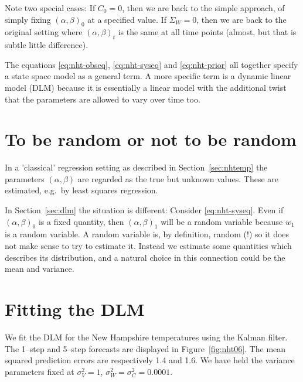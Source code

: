 Note two special cases: If $C_0=0$, then we are back to the simple
approach, of simply fixing $(\alpha,\beta)_{0}$ at a specified value. 
If $\Sigma_W=0$, then we are back to the original setting
where $(\alpha,\beta)_t$ is the same at all time points (almost, but
that is subtle little difference). 

The equations \eqref{eq:nht-obseq}, \eqref{eq:nht-syseq} and
\eqref{eq:nht-prior} all together specify a state space model as a
general term. A more specific term is a dynamic linear model (DLM)
because it is essentially a linear model with the additional twist
that the parameters are allowed to vary over time too.


\section{To be random or not to be random}

In a 'classical' regression setting as described in
Section~\ref{sec:nhtemp} the parameters $(\alpha,\beta)$ are regarded
as the true but unknown values. These are estimated, e.g.\ by least
squares regression. 

In Section~\ref{sec:dlm} the situation is different: Consider
\eqref{eq:nht-syseq}. Even if $(\alpha,\beta)_0$ is a fixed quantity,
then $(\alpha,\beta)_1$ will be a random variable because $w_1$ is a
random variable. A random variable is, by definition, random (!) so it
does not make sense to try to estimate it. Instead we estimate some
quantities which describes its distribution, and  a natural choice in
this connection could be the mean and variance. 










\section{Fitting the DLM}

We fit the DLM for the New Hampshire temperatures using the Kalman
filter. The 1--step and 5--step forecasts are displayed in
Figure~\ref{fig:nht06}. The mean squared prediction errors are
respectively 1.4 and 1.6. We have held the variance parameters fixed
at $\sigma^2_V=1$, $\sigma^2_W=\sigma^2_C=0.0001$. 
 
